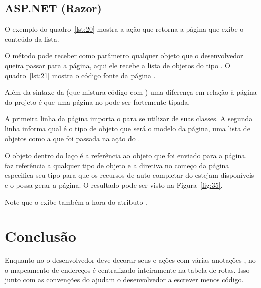 \subsection{ASP.NET (Razor)}

O exemplo do quadro~\ref{lst:20} mostra a ação que retorna a página que exibe o conteúdo da lista.


O método  pode receber como parâmetro qualquer objeto que o desenvolvedor queira passar para a página, aqui ele recebe a lista de objetos do tipo . O quadro~\ref{lst:21} mostra o código fonte da página .


Além da sintaxe da  (que mistura código  com ) uma diferença em relação à página do projeto  é que uma página no  pode ser fortemente tipada.

A primeira linha da página importa o   para se utilizar de suas classes. A segunda linha informa qual é o tipo de objeto que será o modelo da página, uma lista de objetos  como a que foi passada na ação do .

O objeto  dentro do laço  é a referência ao objeto que foi enviado para a página.  faz referência a qualquer tipo de objeto e a diretiva  no começo da página especifica seu tipo para que os recursos de auto completar do  estejam disponíveis e o  possa gerar a página. O resultado pode ser visto na Figura~\ref{fig:35}.


Note que o  exibe também a hora do atributo .

\section{Conclusão}

Enquanto no  o desenvolvedor deve decorar seus  e ações com várias anotações , no  o mapeamento de endereços é centralizado inteiramente na tabela de rotas. Isso junto com as convenções do  ajudam o desenvolvedor a escrever menos código.

